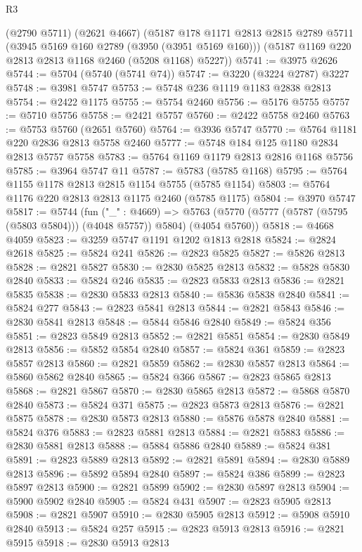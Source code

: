 \begin{lexlean}{R3}
\begin{coremodule}
    (@2790 @5711)
    (@2621 @4667)
    (@5187
      @178
      @1171
      @2813
      @2815
      @2789
      @5711
      (@3945 @5169 @160 @2789 (@3950 (@3951 @5169 @160)))
      (@5187 @1169 @220 @2813 @2813 @1168 @2460 (@5208 @1168) @5227))
@5741 := @3975 @2626
@5744 := @5704 (@5740 (@5741 @74))
@5747 := @3220 (@3224 @2787) @3227
@5748 := @3981 @5747
@5753 := @5748 @236 @1119 @1183 @2838 @2813
@5754 := @2422 @1175
@5755 := @5754 @2460
@5756 := @5176 @5755
@5757 := @5710 @5756
@5758 := @2421 @5757
@5760 := @2422 @5758 @2460
@5763 := @5753 @5760 (@2651 @5760)
@5764 := @3936 @5747
@5770 := @5764 @1181 @220 @2836 @2813 @5758 @2460
@5777 := @5748 @184 @125 @1180 @2834 @2813 @5757 @5758
@5783 := @5764 @1169 @1179 @2813 @2816 @1168 @5756
@5785 := @3964 @5747 @11
@5787 := @5783 (@5785 @1168)
@5795 := @5764 @1155 @1178 @2813 @2815 @1154 @5755 (@5785 @1154)
@5803 := @5764 @1176 @220 @2813 @2813 @1175 @2460 (@5785 @1175)
@5804 := @3970 @5747
@5817 := @5744
    (fun ("_" : @4669) =>
    @5763 (@5770 (@5777 (@5787 (@5795 (@5803 @5804))) (@4048 @5757)) @5804) (@4054 @5760))
@5818 := @4668 @4059
@5823 := @3259 @5747 @1191 @1202 @1813 @2818
@5824 := @2824 @2618
@5825 := @5824 @241
@5826 := @2823 @5825
@5827 := @5826 @2813
@5828 := @2821 @5827
@5830 := @2830 @5825 @2813
@5832 := @5828 @5830 @2840
@5833 := @5824 @246
@5835 := @2823 @5833 @2813
@5836 := @2821 @5835
@5838 := @2830 @5833 @2813
@5840 := @5836 @5838 @2840
@5841 := @5824 @277
@5843 := @2823 @5841 @2813
@5844 := @2821 @5843
@5846 := @2830 @5841 @2813
@5848 := @5844 @5846 @2840
@5849 := @5824 @356
@5851 := @2823 @5849 @2813
@5852 := @2821 @5851
@5854 := @2830 @5849 @2813
@5856 := @5852 @5854 @2840
@5857 := @5824 @361
@5859 := @2823 @5857 @2813
@5860 := @2821 @5859
@5862 := @2830 @5857 @2813
@5864 := @5860 @5862 @2840
@5865 := @5824 @366
@5867 := @2823 @5865 @2813
@5868 := @2821 @5867
@5870 := @2830 @5865 @2813
@5872 := @5868 @5870 @2840
@5873 := @5824 @371
@5875 := @2823 @5873 @2813
@5876 := @2821 @5875
@5878 := @2830 @5873 @2813
@5880 := @5876 @5878 @2840
@5881 := @5824 @376
@5883 := @2823 @5881 @2813
@5884 := @2821 @5883
@5886 := @2830 @5881 @2813
@5888 := @5884 @5886 @2840
@5889 := @5824 @381
@5891 := @2823 @5889 @2813
@5892 := @2821 @5891
@5894 := @2830 @5889 @2813
@5896 := @5892 @5894 @2840
@5897 := @5824 @386
@5899 := @2823 @5897 @2813
@5900 := @2821 @5899
@5902 := @2830 @5897 @2813
@5904 := @5900 @5902 @2840
@5905 := @5824 @431
@5907 := @2823 @5905 @2813
@5908 := @2821 @5907
@5910 := @2830 @5905 @2813
@5912 := @5908 @5910 @2840
@5913 := @5824 @257
@5915 := @2823 @5913 @2813
@5916 := @2821 @5915
@5918 := @2830 @5913 @2813

\end{coremodule}
\end{lexlean}
